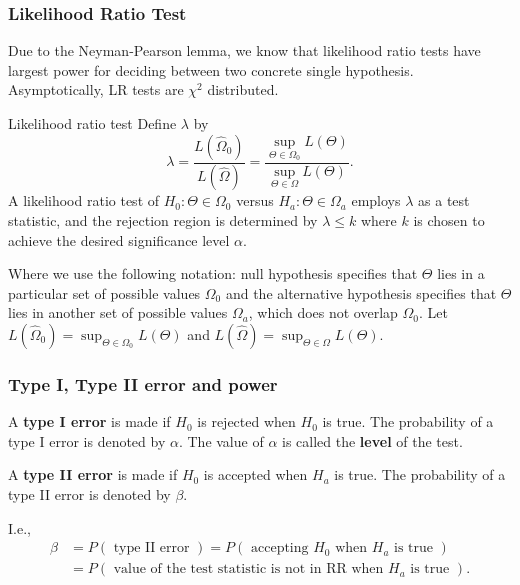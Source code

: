\documentclass[11pt, %
	oneside, %
	english, %
	onehalfspacing, %
	]{article} %
\numberwithin{equation}{section}
\begin{document}
\subsubsection*{Likelihood Ratio Test}

Due to the Neyman-Pearson lemma, we know that likelihood ratio tests have largest power for deciding between two concrete single hypothesis. Asymptotically, LR tests are $\chi^2$ distributed.

\begin{definition}{Likelihood ratio test}{}
    Define $\lambda$ by
    $$
    \lambda=\frac{L\left(\hat{\Omega}_0\right)}{L(\hat{\Omega})}=\frac{\sup _{\Theta \in \Omega_0} L(\Theta)}{\sup _{\Theta \in \Omega} L(\Theta)} .
    $$
    A likelihood ratio test of $H_0: \Theta \in \Omega_0$ versus $H_a: \Theta \in \Omega_a$ employs $\lambda$ as a test statistic, and the rejection region is determined by $\lambda \leq k$ where $k$ is chosen to achieve the desired significance level $\alpha$.
\end{definition}

Where we use the following notation: null hypothesis specifies that $\Theta$ lies in a particular set of possible values $\Omega_0$ and the alternative hypothesis specifies that $\Theta$ lies in another set of possible values $\Omega_a$, which does not overlap $\Omega_0$. Let $L\left(\hat{\Omega}_0\right)=\sup _{\Theta \in \Omega_0} L(\Theta)$ and $L(\hat{\Omega})=\sup _{\Theta \in \Omega} L(\Theta)$.


\subsubsection*{Type I, Type II error and power}


\begin{definition}{}{}
    A \textbf{type I error} is made if $H_0$ is rejected when $H_0$ is true. The probability of a type I error is denoted by $\alpha$. The value of $\alpha$ is called the \textbf{level} of the test.

    A \textbf{type II error} is made if $H_0$ is accepted when $H_a$ is true. The probability of a type II error is denoted by $\beta$.
\end{definition}
I.e.,
\begin{equation*}
    \begin{aligned}
        \beta & =P(\text { type II error })=P\left(\text { accepting } H_0 \text { when } H_a \text { is true }\right) \\
        & =P\left(\text { value of the test statistic is not in } \mathrm{RR} \text { when } H_a \text { is true }\right) .
    \end{aligned}
\end{equation*}
\end{document}
